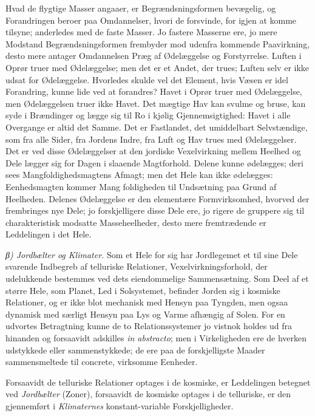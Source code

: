 \documentclass[12pt,a4paper]{book}
\newcommand{\subrunin}[1]{\emph{#1}\hspace{0.4em}}
\begin{document}
Hvad de flygtige Masser angaaer, er Begrændsningsformen bevægelig, og
Forandringen beroer paa Omdannelser, hvori de forsvinde, for igjen at
komme tilsyne; anderledes med de faste Masser. Jo fastere Masserne ere,
jo mere Modstand Begrændsningsformen frembyder mod udenfra kommende
Paavirkning, desto mere antager Omdannelsen Præg af Ødelæggelse og
Forstyrrelse. Luften i Oprør truer med Ødelæggelse; men det er et Andet,
der trues; Luften selv er ikke udsat for Ødelæggelse. Hvorledes skulde vel
det Element, hvis Væsen er idel Forandring, kunne lide ved at forandres?
Havet i Oprør truer med Ødelæggelse, men Ødelæggelsen truer ikke Havet.
Det mægtige Hav kan svulme og bruse, kan syde i Brændinger og lægge sig
til Ro i kjølig Gjennemsigtighed: Havet i alle Overgange er altid det
Samme. Det er Fastlandet, det umiddelbart Selvstændige, som fra alle
Sider, fra Jordens Indre, fra Luft og Hav trues med Ødelæggelser. Det er
ved disse Ødelæggelser at den jordiske Vexelvirkning mellem Heelhed og
Dele lægger sig for Dagen i slaaende Magtforhold. Delene kunne ødelægges;
deri sees Mangfoldighedsmagtens Afmagt; men det Hele kan ikke ødelægges:
Eenhedsmagten kommer Mang\-%
foldigheden til Undsætning paa Grund af Heelheden. Delenes Ødelæggelse er
den elementære Formvirksomhed, hvorved der frembringes nye Dele; jo
forskjelligere disse Dele ere, jo rigere de gruppere sig til
charakteristisk modsatte Masseheelheder, desto mere fremtrædende er
Leddelingen i det Hele.

\subrunin{β) Jordbælter og Klimater.} Som et Hele for sig har Jordlegemet
et til sine Dele svarende Indbegreb af telluriske Relationer,
Vexelvirkningsforhold, der udelukkende bestemmes ved dets eiendommelige
Sammensætning. Som Deel af et større Hele, som Planet, Led i Solsystemet,
befinder Jorden sig i kosmiske Relationer, og er ikke blot mechanisk med
Hensyn paa Tyngden, men ogsaa dynamisk med særligt Hensyn paa Lys og
Varme afhængig af Solen. For en udvortes Betragtning kunne de to
Relationssystemer jo vistnok holdes ud fra hinanden og forsaavidt adskilles
\textit{in abstracto}; men i Virkeligheden ere de hverken udstykkede eller
sammenstykkede; de ere paa de forskjelligste Maader sammensmeltede til
concrete, virksomme Eenheder.

Forsaavidt de telluriske Relationer optages i de kosmiske, er Leddelingen
betegnet ved \emph{Jordbælter} (Zoner), forsaavidt de kosmiske optages i de
telluriske, er den gjennemført i \emph{Klimaternes} konstant-variable
Forskjelligheder.
\end{document}
